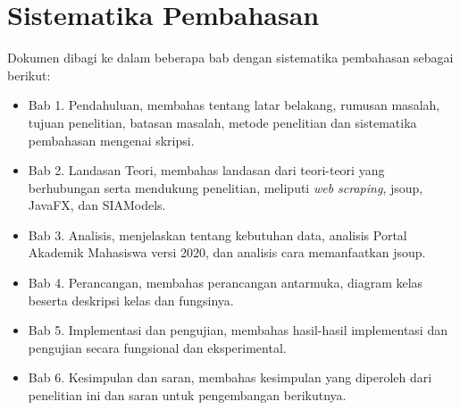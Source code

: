 \section{Sistematika Pembahasan}
\label{sec:sispem}
Dokumen dibagi ke dalam beberapa bab dengan sistematika pembahasan sebagai berikut:
    \begin{itemize}
        \item Bab 1. Pendahuluan, membahas tentang latar belakang, rumusan masalah, tujuan penelitian, batasan masalah, metode penelitian dan sistematika pembahasan mengenai skripsi.
        \item Bab 2. Landasan Teori, membahas landasan dari teori-teori yang berhubungan serta mendukung penelitian, meliputi \textit{web scraping}, jsoup, JavaFX, dan SIAModels. 
        \item Bab 3. Analisis, menjelaskan tentang kebutuhan data, analisis Portal Akademik Mahasiswa versi 2020, dan analisis cara memanfaatkan jsoup.
        \item Bab 4. Perancangan, membahas perancangan antarmuka, diagram kelas beserta deskripsi kelas dan fungsinya.
        \item Bab 5. Implementasi dan pengujian, membahas hasil-hasil implementasi dan pengujian secara fungsional dan eksperimental.
        \item Bab 6. Kesimpulan dan saran, membahas kesimpulan yang diperoleh dari penelitian ini dan saran untuk pengembangan berikutnya.
    \end{itemize}